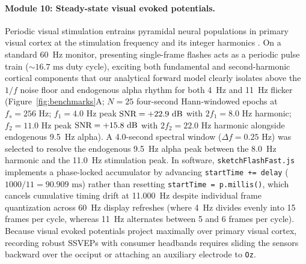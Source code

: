 \documentclass[11pt,letterpaper]{article}
\begin{document}
\paragraph{Module 10: Steady-state visual evoked potentials.} Periodic visual stimulation entrains pyramidal neural populations in primary visual cortex at the stimulation frequency and its integer harmonics \citep{norcia2015steady}. On a standard 60~Hz monitor, presenting single-frame flashes acts as a periodic pulse train ($\sim 16.7\text{ ms}$ duty cycle), exciting both fundamental and second-harmonic cortical components that our analytical forward model clearly isolates above the $1/f$ noise floor and endogenous alpha rhythm for both 4~Hz and 11~Hz flicker (Figure~\ref{fig:benchmarks}A; $N = 25$ four-second Hann-windowed epochs at $f_s = 256\text{ Hz}$; $f_1 = 4.0\text{ Hz}$ peak $\text{SNR} = +22.9\text{ dB}$ with $2f_1 = 8.0\text{ Hz}$ harmonic; $f_2 = 11.0\text{ Hz}$ peak $\text{SNR} = +15.8\text{ dB}$ with $2f_2 = 22.0\text{ Hz}$ harmonic alongside endogenous 9.5~Hz alpha). A 4.0-second spectral window ($\Delta f = 0.25\text{ Hz}$) was selected to resolve the endogenous 9.5~Hz alpha peak between the 8.0~Hz harmonic and the 11.0~Hz stimulation peak. In software, \texttt{sketchFlashFast.js} implements a phase-locked accumulator by advancing \texttt{startTime += delay} ($1000/11 = 90.909\text{ ms}$) rather than resetting \texttt{startTime = p.millis()}, which cancels cumulative timing drift at 11.000~Hz despite individual frame quantization across 60~Hz display refreshes (where 4~Hz divides evenly into 15 frames per cycle, whereas 11~Hz alternates between 5 and 6 frames per cycle). Because visual evoked potentials project maximally over primary visual cortex, recording robust SSVEPs with consumer headbands requires sliding the sensors backward over the occiput or attaching an auxiliary electrode to \texttt{Oz}.
\end{document}
